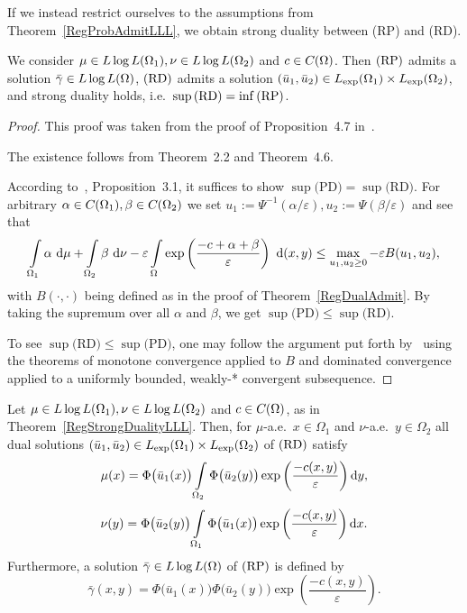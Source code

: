 If we instead restrict ourselves to the assumptions from Theorem~\ref{RegProbAdmitLLL}, we obtain strong duality between (RP) and (RD).

\begin{theorem}\label{RegStrongDualityLLL}
	We consider $\mu \in \LLL[\Omega_1], \nu \in \LLL[\Omega_2]$ and $c \in \CF{\Omega}$. Then$\text{\normalfont\ (RP)}$ admits a solution $\bar{\gamma} \in \LLL$,$\text{\normalfont\ (RD)}$ admits a solution $(\bar{u}_1, \bar{u}_2) \in \Lexp[\Omega_1] \times \Lexp[\Omega_2]$, and strong duality holds, i.e.\ $\sup\!\text{\normalfont\,(RD)} = \inf\!\text{\normalfont\,(RP)}$.
\end{theorem}

\begin{proof}
	This proof was taken from the proof of Proposition~4.7 in~\cite{Cla2021}.

	The existence follows from Theorem~2.2 and Theorem~4.6.

	According to\ \cite{Cla2021}, Proposition~3.1, it suffices to show $\sup \text{(PD)} = \sup \text{(RD)}$. For arbitrary $\alpha \in \CF{\Omega_1}, \beta \in \CF{\Omega_2}$ we set $u_1 := \Psi^{-1}(\alpha/\varepsilon), u_2 := \Psi(\beta/\varepsilon)$ and see that
	\[ \int\limits_{\Omega_1} \alpha~\D + \int\limits_{\Omega_2} \beta~\D[\nu] - \varepsilon \int\limits_\Omega \exp\left( \frac{-c + \alpha + \beta}{\varepsilon} \right)~\D[(x, y)] \le \max\limits_{u_1, u_2 \ge 0} -\varepsilon B(u_1, u_2), \]
	with $B(\cdot, \cdot)$ being defined as in the proof of Theorem~\ref{RegDualAdmit}. By taking the supremum over all $\alpha$ and $\beta$, we get $\sup \text{(PD)} \le \sup \text{(RD)}$.

	To see $\sup \text{(RD)} \le \sup \text{(PD)}$, one may follow the argument put forth by\ \cite{Cla2021} using the theorems of monotone convergence applied to $B$ and dominated convergence applied to a uniformly bounded, weakly-* convergent subsequence.
\end{proof}

\begin{corollary}\label{RegOptCond}
	Let $\mu \in \LLL[\Omega_1], \nu \in \LLL[\Omega_2]$ and $c \in \CF{\Omega}$, as in Theorem~\ref{RegStrongDualityLLL}. Then, for $\mu$-a.e.\ $x \in \Omega_1$ and $\nu$-a.e.\ $y \in \Omega_2$ all dual solutions $(\bar{u}_1, \bar{u}_2) \in \Lexp[\Omega_1] \times \Lexp[\Omega_2]$ of$\text{\normalfont\ (RD)}$ satisfy
	\[ \mu(x) = \Phi\big( \bar{u}_1(x) \big) \int\limits_{\Omega_2} \Phi\big( \bar{u}_2(y) \big) \exp \left( \frac{- c(x, y)}{\varepsilon} \right)\D[y], \]
	\[ \nu(y) = \Phi\big( \bar{u}_2(y) \big) \int\limits_{\Omega_1} \Phi\big( \bar{u}_1(x) \big) \exp \left( \frac{- c(x, y)}{\varepsilon} \right)\D[x]. \]
	Furthermore, a solution $\bar{\gamma} \in \LLL$ of$\text{\normalfont\ (RP)}$ is defined by
	\[ \bar{\gamma}(x, y) = \Phi\big( \bar{u}_1(x) \big) \Phi\big( \bar{u}_2(y) \big) \exp\left( \frac{- c(x, y)}{\varepsilon} \right). \]
\end{corollary}

